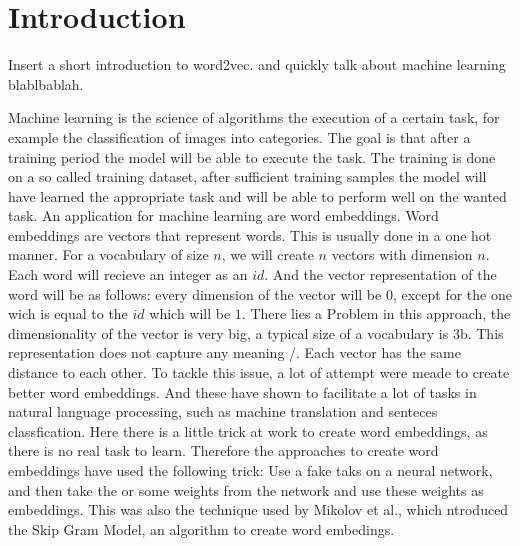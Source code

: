 \chapter{Introduction}\label{chap:introduction}

Insert a short introduction to word2vec. and quickly talk about machine learning blablbablah. 


Machine learning is the science of algorithms the execution of a certain task, for example the classification of images into categories. The goal is that after a training period the model will be able to execute the task. The training is done on a so called training dataset, after sufficient training samples the model will have learned the appropriate task and will be able to perform well on the wanted task. An application for machine learning are word embeddings. Word embeddings are vectors that represent words. This is usually done in a one hot manner. For a vocabulary of size $n$, we will create $n$ vectors with dimension $n$. Each word will recieve an integer as an $id$. And the vector representation of the word will be as follows: every dimension of the vector will be $0$, except for the one wich is equal to the $id$ which will be $1$. There lies a Problem in this approach, the dimensionality of the vector is very big, a typical size of a vocabulary is 3b. This representation does not capture any meaning /. Each vector has the same distance to each other. To tackle this issue, a lot of attempt were meade to create better word embeddings. And these have shown to facilitate a lot of tasks in natural language processing, such as machine translation and senteces classfication. Here there is a little trick at work to create word embeddings, as there is no real task to learn. Therefore the approaches to create word embeddings have used the following trick: Use a fake taks on a neural network, and then take the or some weights from the network and use these weights as embeddings. This was also the technique used by Mikolov et al., which ntroduced the Skip Gram Model, an algorithm to create word embedings.   














